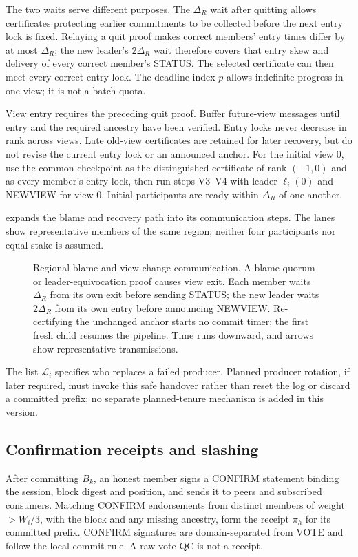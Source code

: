 \documentclass[11pt,a4paper,onecolumn]{article}
\begin{document}
The two waits serve different purposes. The $\Delta_R$ wait after quitting
allows certificates protecting earlier commitments to be collected before
the next entry lock is fixed. Relaying a quit proof makes correct members'
entry times differ by at
most $\Delta_R$; the new leader's $2\Delta_R$ wait therefore covers that
entry skew and delivery of every correct member's STATUS. The selected
certificate can then meet every correct entry lock. The deadline index $p$
allows indefinite progress in one view; it is not a batch quota.

View entry requires the preceding quit proof. Buffer future-view messages
until entry and the required ancestry have been verified. Entry locks never
decrease in rank across views. Late old-view certificates are retained for
later recovery, but do not revise the current entry lock or an announced anchor.
For the initial view $0$, use the common checkpoint as the distinguished
certificate of rank $(-1,0)$ and as every member's entry lock, then run
steps V3--V4 with leader $\ell_i(0)$ and NEWVIEW for view $0$.
Initial participants are ready within $\Delta_R$ of one another.

 expands the blame and recovery path into its communication
steps. The lanes show representative members of the same region; neither
four participants nor equal stake is assumed.

\begin{figure}[p]\centering
\resizebox{\linewidth}{!}{}
\caption{Regional blame and view-change communication. A blame quorum or
leader-equivocation proof causes view exit. Each member waits $\Delta_R$
from its own exit before sending STATUS; the new leader waits $2\Delta_R$
from its own entry before announcing NEWVIEW. Re-certifying the unchanged
anchor starts no commit timer; the first fresh child resumes the pipeline.
Time runs downward, and arrows show representative transmissions.}
\label{fig:change}
\end{figure}

The list $\mathcal L_i$ specifies who replaces a failed producer. Planned
producer rotation, if later required, must invoke this safe handover rather
than reset the log or discard a committed prefix; no separate planned-tenure
mechanism is added in this version.

\subsection{Confirmation receipts and slashing}\label{sec:receipt}
After committing $B_k$, an honest member signs a CONFIRM statement binding
the session, block digest and position, and sends it to peers and subscribed
consumers. Matching CONFIRM endorsements from distinct members of weight
$>W_i/3$, with the block and any missing ancestry, form the receipt $\pi_h$
for its committed prefix. CONFIRM signatures are domain-separated from VOTE
and follow the local commit rule. A raw vote QC is not a receipt.
\end{document}
